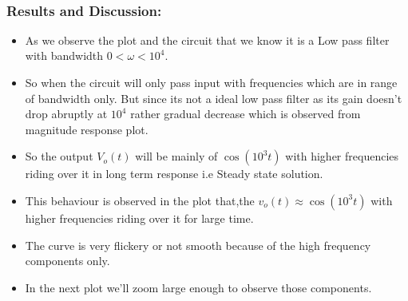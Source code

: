 \documentclass[10pt,a4paper]{article}
\providecommand{\tightlist}{%
      \setlength{\itemsep}{0pt}\setlength{\parskip}{0pt}}
\begin{document}
    \begin{center}
    \end{center}
    { \hspace*{\fill} \\}
    
    \subsubsection{Results and Discussion:}\label{results-and-discussion}

\begin{itemize}
\tightlist
\item
  As we observe the plot and the circuit that we know it is a Low pass
  filter with bandwidth \(0< \omega < 10^4\).
\item
  So when the circuit will only pass input with frequencies which are in
  range of bandwidth only. But since its not a ideal low pass filter as
  its gain doesn't drop abruptly at \(10^4\) rather gradual decrease
  which is observed from magnitude response plot.
\item
  So the output \(V_o(t)\) will be mainly of \(\cos(10^{3}t)\) with
  higher frequencies riding over it in long term response i.e Steady
  state solution.
\item
  This behaviour is observed in the plot that,the
  \(v_o(t) \approx \cos(10^{3}t)\) with higher frequencies riding over
  it for large time.
\item
  The curve is very flickery or not smooth because of the high frequency
  components only.
\item
  In the next plot we'll zoom large enough to observe those components.
\end{itemize}
\end{document}
